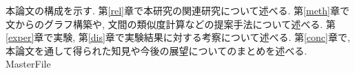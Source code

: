 \documentclass[a4j,12pt]{thesis} %
\begin{document}
\par 本論文の構成を示す. 第\ref{rel}章で本研究の関連研究について述べる. 第\ref{meth}章で文からのグラフ構築や, 文間の類似度計算などの提案手法について述べる. 第\ref{exper}章で実験, 第\ref{dis}章で実験結果に対する考察について述べる. 第\ref{conc}章で,本論文を通して得られた知見や今後の展望についてのまとめを述べる.
\expandafter\ifx\csname MasterFile\endcsname\relax
\def\MasterFile{本原稿です}

% 
% 

% 

\end{document}
